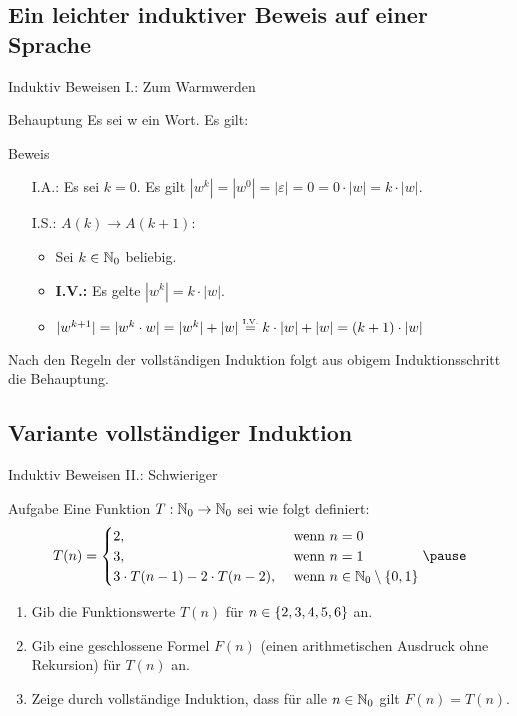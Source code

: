 \subsection{Ein leichter induktiver Beweis auf einer Sprache}
\begin{frame}{Induktiv Beweisen I.: Zum Warmwerden}
	\begin{exampleblock}{Behauptung}
		Es sei w ein Wort. Es gilt:\\[.5em]
	\end{exampleblock}
\pause
	\begin{block}{Beweis}
		\begin{itemize}
			\item[I.A.:] Es sei $k=0$. Es gilt $|w^k|=|w^0|=|\varepsilon|=0=0 \cdot |w| = k \cdot |w|$.
			\item[I.S.:] $A(k) \rightarrow A(k+1)$:
				\begin{itemize}
					\item Sei $k \in \mathbb{N}_{0}$ beliebig.
					\item \textbf{I.V.:} Es gelte $|w^k|=k \cdot |w|$. \\[1em]
					\item $|w^{k+1}|=|w^k \cdot w|=|w^k|+|w| \eqtext{I.V.} k \cdot |w| + |w| = (k+1) \cdot |w|$
				\end{itemize}						
		\end{itemize}

		Nach den Regeln der vollständigen Induktion folgt aus obigem Induktionsschritt die Behauptung.
	\end{block}
\end{frame}
\subsection{Variante vollständiger Induktion} %
\begin{frame}{Induktiv Beweisen II.: Schwieriger}
	\begin{exampleblock}{Aufgabe}
		Eine Funktion $T:\mathbb{N}_0 \rightarrow \mathbb{N}_0$ sei wie folgt definiert:
		\begin{equation*}
		T(n) = 
			\begin{cases}
			 2, &\text{ wenn } n=0 \\
			 3, &\text{ wenn } n=1 \\
			 3 \cdot T(n-1) - 2 \cdot T(n-2), &\text{ wenn }n \in \nN_0 \setminus \set{0,1}
		\end{cases} \pause
		\end{equation*}
		\begin{enumerate}
			\item Gib die Funktionswerte $T(n)$ für $n \in \left\{ 2,3,4,5,6 \right\}$ an.
			\item Gib eine geschlossene Formel $F(n)$ (einen arithmetischen Ausdruck ohne Rekursion) für $T(n)$ an.
			\item Zeige durch vollständige Induktion, dass für alle $n \in \mathbb{N}_0$ gilt $F(n) = T(n)$.
		\end{enumerate}
	\end{exampleblock}
\end{frame}
